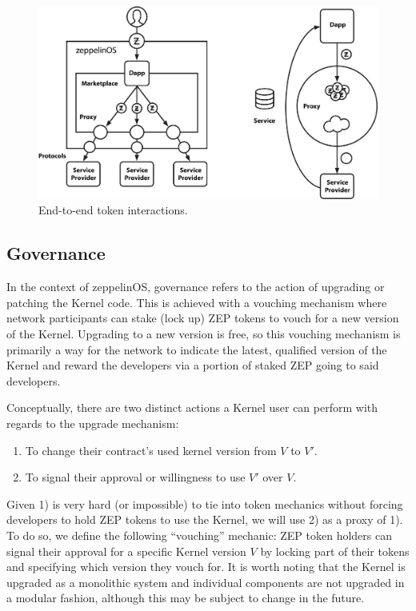 \documentclass[]{article}
\makeatletter
\DeclareRobustCommand{\_}{%
  \leavevmode\vbox{%
    \hrule\@width.5em
          \@height-.26ex
          \@depth\dimexpr.26ex+.28pt\relax}}
\makeatother
\begin{document}
\begin{figure}
  \centering
  \includegraphics[width=0.75\linewidth]{images/image2.jpg}

  \caption{End-to-end token interactions.}
\end{figure}

\subsection{Governance}

In the context of zeppelinOS, governance refers to the action of
upgrading or patching the Kernel code. This is achieved with a vouching
mechanism where network participants can stake (lock up) ZEP tokens to
vouch for a new version of the Kernel. Upgrading to a new version is
free, so this vouching mechanism is primarily a way for the network to
indicate the latest, qualified version of the Kernel and reward the
developers via a portion of staked ZEP going to said developers.

Conceptually, there are two distinct actions a Kernel user can
perform with regards to the upgrade mechanism:

\begin{enumerate}[label=\arabic*)]
  \item
    To change their contract's used kernel version from $V$ to $V'$. 
  \item
    To signal their approval or willingness to use $V'$ over $V$.
\end{enumerate}

Given 1) is very hard (or impossible) to tie into token mechanics
without forcing developers to hold ZEP tokens to use the Kernel,
we will use 2) as a proxy of 1). To do so, we define the following
``vouching'' mechanic: ZEP token holders can signal their approval for a
specific Kernel version $V$ by locking part of their tokens and
specifying which version they vouch for. It is worth noting that the
Kernel is upgraded as a monolithic system and individual components
are not upgraded in a modular fashion, although this may be subject
to change in the future.
\end{document}
